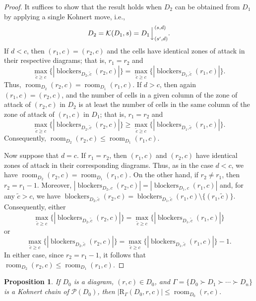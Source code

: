 \documentclass[letterpaper,10pt]{article}
\newcommand{\ldownarrow}{\Big\downarrow}
\newtheorem{prop}[theorem]{Proposition}
\DeclareMathOperator{\room}{room}
\DeclareMathOperator{\blockers}{blockers}
\begin{document}
\begin{proof}
    It suffices to show that the result holds when $D_2$ can be obtained from $D_1$ by applying a single Kohnert move, i.e., $$D_2=\mathcal{K}(D_1,s)=D_1\ldownarrow^{(s, d)}_{(s', d)}.$$ If $d < c$, then $(r_1, c) = (r_2, c)$ and the cells have identical zones of attack in their respective diagrams; that is, $r_1=r_2$ and $$\max_{\tilde{c} \geq c} \{|\blockers_{D_2, \tilde{c}}(r_2, c)|\}=\max_{\tilde{c} \geq c} \{|\blockers_{D_1, \tilde{c}}(r_1, c)|\}.$$ Thus, $\room_{D_2}(r_2, c) = \room_{D_1}(r_1, c)$. If $d > c$, then again $(r_1 ,c) = (r_2, c)$, and the number of cells in a given column of the zone of attack of $(r_2,c)$ in $D_2$ is at least the number of cells in the same column of the zone of attack of $(r_1, c)$ in $D_1$; that is, $r_1=r_2$ and $$\max_{\tilde{c} \geq c} \{|\blockers_{D_2, \tilde{c}}(r_2, c)|\}\ge \max_{\tilde{c} \geq c} \{|\blockers_{D_1, \tilde{c}}(r_1, c)|\}.$$ Consequently, $\room_{D_2}(r_2, c) \leq \room_{D_1}(r_1, c)$. 

    Now suppose that $d = c$. If $r_1 = r_2$, then $(r_1, c)$ and $(r_2, c)$ have identical zones of attack in their corresponding diagrams. Thus, as in the case $d<c$, we have $\room_{D_2}(r_2, c) = \room_{D_1}(r_1, c)$. On the other hand, if $r_2 \neq r_1$, then $r_2 = r_1 - 1$. Moreover, $|\blockers_{D_2, c}(r_2, c)| = |\blockers_{D_1, c}(r_1, c)|$ and, for any $\tilde{c} > c$, we have $\blockers_{D_2, \tilde{c}}(r_2, c) = \blockers_{D_1, \tilde{c}}(r_1, c) \setminus \{(r_1, \tilde{c})\}$. Consequently, either $$\max_{\tilde{c} \geq c} \{|\blockers_{D_2, \tilde{c}}(r_2, c)|\}=\max_{\tilde{c} \geq c} \{|\blockers_{D_1, \tilde{c}}(r_1, c)|\}$$ or $$\max_{\tilde{c} \geq c} \{|\blockers_{D_2, \tilde{c}}(r_2, c)|\}=\max_{\tilde{c} \geq c} \{|\blockers_{D_1, \tilde{c}}(r_1, c)|\}-1.$$ In either case, since $r_2=r_1-1$, it follows that $\room_{D_2}(r_2, c)\le \room_{D_1}(r_1, c)$.
\end{proof}

\begin{prop}\label{prop:upperbound}
    If $D_0$ is a diagram, $(r, c) \in D_0$, and $\Gamma = \{D_0\succ D_1 \succ \cdots \succ D_n\}$ is a Kohnert chain of $\mathcal{P}(D_0)$, then $|\mathrm{R}_{\Gamma}(D_0,r, c)| \leq \room_{D_0}(r, c)$.
\end{prop}
\end{document}
